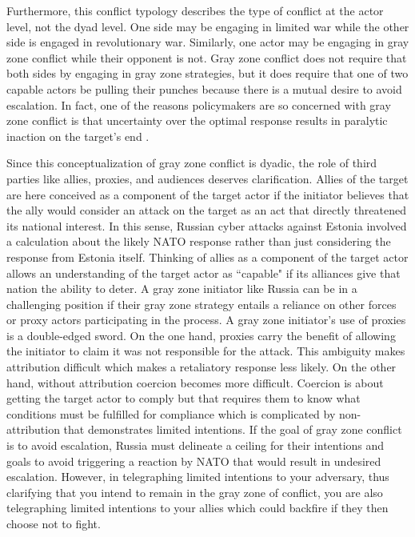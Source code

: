 \documentclass[12pt,letterpaper]{article}
\begin{document}

	Furthermore, this conflict typology describes the type of conflict at the actor level, not the dyad level. One side may be engaging in limited war while the other side is engaged in revolutionary war. Similarly, one actor may be engaging in gray zone conflict while their opponent is not. Gray zone conflict does not require that both sides by engaging in gray zone strategies, but it does require that one of two capable actors be pulling their punches because there is a mutual desire to avoid escalation. In fact, one of the reasons policymakers are so concerned with gray zone conflict is that uncertainty over the optimal response results in paralytic inaction on the target's end  \citep{maxwell_grayzonesubject_2016}.

	Since this conceptualization of gray zone conflict is dyadic, the role of third parties like allies, proxies, and audiences deserves clarification. Allies of the target are here conceived as a component of the target actor if the initiator believes that the ally would consider an attack on the target as an act that directly threatened its national interest. In this sense, Russian cyber attacks against Estonia involved a calculation about the likely NATO response rather than just considering the response from Estonia itself. Thinking of allies as a component of the target actor allows an understanding of the target actor as ``capable" if its alliances give that nation the ability to deter. A gray zone initiator like Russia can be in a challenging position if their gray zone strategy entails a reliance on other forces or proxy actors participating in the process. A gray zone initiator's use of proxies is a double-edged sword. On the one hand, proxies carry the benefit of allowing the initiator to claim it was not responsible for the attack. This ambiguity makes attribution difficult which makes a retaliatory response less likely. On the other hand, without attribution coercion becomes more difficult. Coercion is about getting the target actor to comply but that requires them to know what conditions must be fulfilled for compliance which is complicated by non-attribution that demonstrates limited intentions. If the goal of gray zone conflict is to avoid escalation, Russia must delineate a ceiling for their intentions and goals to avoid triggering a reaction by NATO that would result in undesired escalation. However, in telegraphing limited intentions to your adversary, thus clarifying that you intend to remain in the gray zone of conflict, you are also telegraphing limited intentions to your allies which could backfire if they then choose not to fight.
\end{document}
